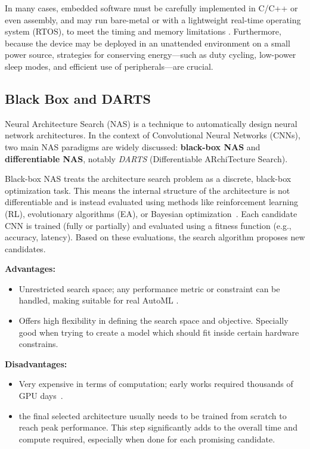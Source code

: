 In many cases, embedded software must be carefully implemented in C/C++ or even assembly, and may run bare-metal or with a lightweight real-time operating system (RTOS), to meet the timing and memory limitations \cite{techtarget_embedded_system}. Furthermore, because the device may be deployed in an unattended environment on a small power source, strategies for conserving energy---such as duty cycling, low-power sleep modes, and efficient use of peripherals---are crucial.

\clearpage

\subsection{Black Box and DARTS}
Neural Architecture Search (NAS) is a technique to automatically design neural network architectures. In the context of Convolutional Neural Networks (CNNs), two main NAS paradigms are widely discussed: \textbf{black-box NAS} and \textbf{differentiable NAS}, notably \textit{DARTS} (Differentiable ARchiTecture Search).

Black-box NAS treats the architecture search problem as a discrete, black-box optimization task. This means the internal structure of the architecture is not differentiable and is instead evaluated using methods like reinforcement learning (RL), evolutionary algorithms (EA), or Bayesian optimization~\cite{qiu2023shortest}. Each candidate CNN is trained (fully or partially) and evaluated using a fitness function (e.g., accuracy, latency). Based on these evaluations, the search algorithm proposes new candidates.





\textbf{Advantages:} 
\begin{itemize}
    \item Unrestricted search space; any performance metric or constraint can be handled, making suitable for real AutoML \cite{burrello2023enhancing}.
    \item Offers high flexibility in defining the search space and objective. Specially good when trying to create a model which should fit inside certain hardware constrains.
\end{itemize}

\textbf{Disadvantages:}
\begin{itemize}
    \item Very expensive in terms of computation; early works required thousands of GPU days~\cite{liu2018darts}.
    \item the final selected architecture usually needs to be trained from scratch to reach peak performance. This step significantly adds to the overall time and compute required, especially when done for each promising candidate. 
\end{itemize}

